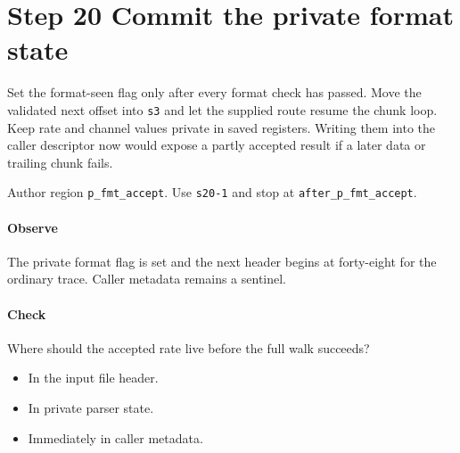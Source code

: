\section{Step 20 Commit the private format state}\label{pcm-wav-s20}
Set the format-seen flag only after every format check has passed. Move the validated next offset into \texttt{s3} and let the supplied route resume the chunk loop. Keep rate and channel values private in saved registers. Writing them into the caller descriptor now would expose a partly accepted result if a later data or trailing chunk fails.

Author region \texttt{p\_fmt\_accept}. Use \texttt{s20-1} and stop at \texttt{after\_p\_fmt\_accept}.

\paragraph{Observe} The private format flag is set and the next header begins at forty-eight for the ordinary trace. Caller metadata remains a sentinel.

\paragraph{Check} Where should the accepted rate live before the full walk succeeds?
\begin{itemize}
  \item[A.] In the input file header.
  \item[B.] In private parser state.
  \item[C.] Immediately in caller metadata.
\end{itemize}
